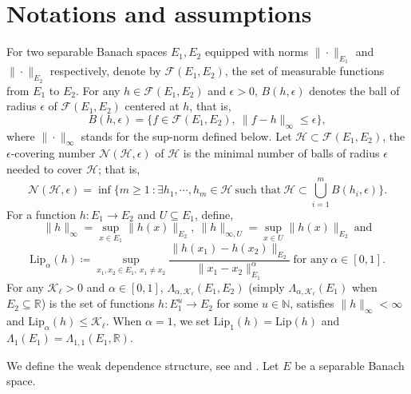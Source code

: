 \documentclass[10pt,twoside]{article}
\numberwithin{equation}{section}
\newcommand{\R}{\ensuremath{\mathbb{R}}}
\newcommand{\N}{\ensuremath{\mathbb{N}}}
\newcommand{\lip}{\ensuremath{\mathrm{Lip}}}
\begin{document}
\section{Notations and assumptions}\label{asump}
%
For  two separable Banach spaces $E_1, E_2$  equipped with norms $\| \cdot\|_{E_1} $ and $\| \cdot\|_{E_2} $ respectively, denote by $\mathcal{F}(E_1, E_2) $, the set of measurable functions from $E_1$ to $E_2$. For any $h \in \mathcal{F}(E_1, E_2) $ and $\epsilon >0$, $B(h,\epsilon) $ denotes the ball of radius $\epsilon$ of $\mathcal{F}(E_1, E_2) $ centered at $h$, that is,
%
\[ B (h, \epsilon) = \big\{ f \in \mathcal{F}(E_1, E_2), ~ \| f - h\|_\infty \leq \epsilon \big\},  \]
%
where $\| \cdot \|_\infty$ stands for the sup-norm defined below.
Let $\mathcal{H} \subset \mathcal{F}(E_1, E_2) $, the $\epsilon$-covering number $\mathcal{N}(\mathcal{H},\epsilon) $ of $\mathcal{H} $ is   the minimal 
  number of balls of radius $\epsilon$ needed to cover  $\mathcal{H} $; that is,
%
\[ \mathcal{N}(\mathcal{H},\epsilon) = \inf\Big\{ m \geq 1 ~ : \exists h_1, \cdots, h_m \in \mathcal{H} ~ \text{such that} ~ \mathcal{H} \subset 
  \bigcup_{i=1}^m B(h_i,\epsilon)    \Big\}.  \]
%
 For a function $h: E_1 \rightarrow E_2$ and $U \subseteq E_1$, define,
%
\[ \| h\|_\infty = \sup_{x \in E_1} \| h(x) \|_{E_2}, ~ \| h\|_{\infty,U} = \sup_{x \in U} \| h(x) \|_{E_2} ~ \text{and}\] 
\[\lip_\alpha (h) \coloneqq \underset{x_1, x_2 \in E_1, ~ x_1\ne x_2}{\sup} \dfrac{ \|h(x_1) - h(x_2)\|_{E_2}}{\| x_1- x_2 \|^\alpha_{E_1}} 
~ \text{for any}  ~ \alpha \in [0,1]. \]
 For any $\mathcal{K}_{\ell} > 0$ and $\alpha \in [0,1]$, $\Lambda_{\alpha,\mathcal{K}_{\ell}} (E_1, E_2) $ (simply $\Lambda_{\alpha,\mathcal{K}_{\ell}} (E_1) $ when $E_2 \subseteq \R$) is the set of functions  $h: E_1^u  \rightarrow E_2$ for some $u \in \N$, satisfies  $\|h\|_\infty < \infty$ and  $\lip_\alpha(h) \leq \mathcal{K}_{\ell}$.
%
When $\alpha=1$, we set  $\lip_1 (h)=\lip(h)$ and $\Lambda_{1}(E_1) =\Lambda_{1,1}(E_1,\R) $. 
%

\medskip

We define the weak dependence structure, see \cite{doukhan1999new} and \cite{dedecker2007weak}. Let $E$ be a separable Banach space.
%
\end{document}
